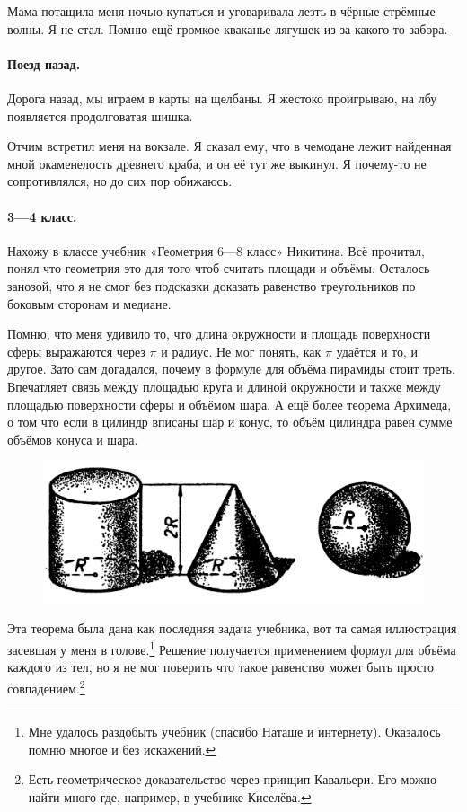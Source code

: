 \documentclass{book}
\begin{document}
Мама потащила меня ночью купаться и уговаривала лезть в чёрные стрёмные волны.
Я не стал.
Помню ещё громкое кваканье лягушек из-за какого-то забора.

\paragraph{Поезд назад.}
Дорога назад, мы играем в карты на щелбаны.
Я жестоко проигрываю, на лбу появляется продолговатая шишка.

Отчим встретил меня на вокзале. 
Я сказал ему, что в чемодане лежит найденная мной окаменелость древнего краба, и он её тут же выкинул.
Я почему-то не сопротивлялся, но до сих пор обижаюсь.


\paragraph{3---4 класс.}
Нахожу в классе учебник «Геометрия 6---8 класс» Никитина.
Всё прочитал, понял что геометрия это для того чтоб считать площади и объёмы.
Осталось занозой, что я не смог без подсказки доказать равенство треугольников по боковым сторонам и медиане.

Помню, что меня удивило то, что длина окружности и площадь поверхности сферы выражаются через $\pi$ и радиус.
Не мог понять, как $\pi$ удаётся и то, и другое.
Зато сам догадался, почему в формуле для объёма пирамиды стоит треть.
Впечатляет связь между площадью круга и длиной окружности 
и также между площадью поверхности сферы и объёмом шара.
А ещё более теорема Архимеда, о том что если в цилиндр вписаны шар и конус, 
то объём цилиндра равен сумме объёмов конуса и шара.
\begin{figure}[ht!]
\centering
\includegraphics[scale=.2]{pics/tzilindr-konus-shar}
\end{figure}
Эта теорема была дана как последняя задача учебника, вот та самая иллюстрация засевшая у меня в голове.\footnote{Мне удалось раздобыть учебник (спасибо Наташе и интернету).
Оказалось помню многое и без искажений.}
Решение получается применением формул для объёма каждого из тел, но я не мог поверить что такое равенство может быть просто совпадением.\footnote{Есть геометрическое доказательство через принцип Кавальери. Его можно найти много где, например, в учебнике Киселёва.}
\end{document}
